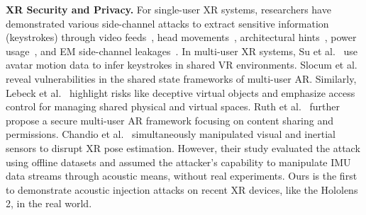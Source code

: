 
\textbf{XR Security and Privacy.} 
For single-user XR systems, researchers have demonstrated various side-channel attacks to extract sensitive information (\eg keystrokes) through video feeds~\cite{ling2019know}, head movements~\cite{nair2023unique, slocum2023going}, architectural hints~\cite{zhang2023its,shang2020arspy}, power usage~\cite{li2024dangers}, and EM side-channel leakages~\cite{al2021vr}. In multi-user XR systems, Su et al.~\cite{su2024remote} use avatar motion data to infer keystrokes in shared VR environments. Slocum et al.~\cite{slocum2024doesn} reveal vulnerabilities in the shared state frameworks of multi-user AR. Similarly, Lebeck et al.~\cite{lebeck2017securing} highlight risks like deceptive virtual objects and emphasize access control for managing shared physical and virtual spaces. Ruth et al.~\cite{ruth2019secure} further propose a secure multi-user AR framework focusing on content sharing and permissions.
Chandio et al.~\cite{chandio2024stealthy} %
simultaneously manipulated visual and inertial sensors to disrupt XR pose estimation. However, their study evaluated the attack using offline datasets and assumed the attacker's capability to manipulate IMU data streams through acoustic means, without real experiments. Ours is the first to demonstrate acoustic injection attacks on recent XR devices, like the Hololens 2, in the real world.